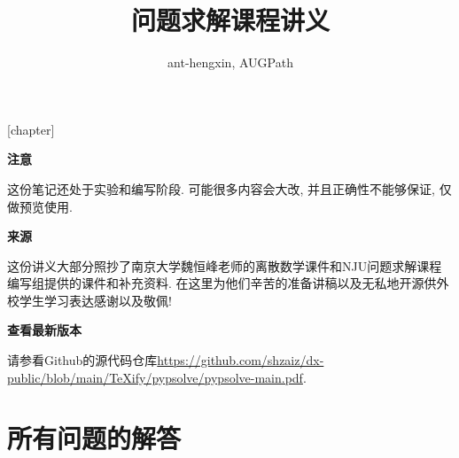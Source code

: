 \usepackage[lastexercise,answerdelayed]{exercise}
[chapter]
\newcommand{\QuestionNB}{\bfseries\arabic{Question}.\ }
\renewcommand{\ExerciseName}{练习题}
\renewcommand{\ExerciseHeader}{\noindent\def\stackalignment{l}%
    \stackunder[0pt]{\colorbox{cyan}{\textcolor{white}{\textbf{\large\ExerciseName\;\LARGE\ExerciseHeaderNB}}}}{\textcolor{lightcyan}{\rule{\linewidth}{2pt}}}\medskip}
\renewcommand{\AnswerName}{Exercises}
\renewcommand{\AnswerHeader}{\ifthenelse{\boolean{firstanswerofthechapter}}%
    {\bigskip\noindent\textcolor{cyan}{\textbf{CHAPTER \thechapter}}\newline\newline%
        \noindent\bfseries\emph{\textcolor{cyan}{\AnswerName\ \ExerciseHeaderNB, page %
                \pageref{\AnswerRef}}}\smallskip}
    {\noindent\bfseries\emph{\textcolor{cyan}{\AnswerName\ \ExerciseHeaderNB, page \pageref{\AnswerRef}}}\smallskip}}
\setlength{\QuestionIndent}{16pt}




\title{问题求解课程讲义}
\author{ant-hengxin, AUGPath}
\maketitle
\begin{center}
{\bf \large 注意}
\end{center}
这份笔记还处于实验和编写阶段. 可能很多内容会大改, 并且正确性不能够保证, 仅做预览使用. 


\begin{center}
{\bf \large 来源}
\end{center}

这份讲义大部分照抄了南京大学魏恒峰老师的离散数学课件和NJU问题求解课程编写组提供的课件和补充资料. 在这里为他们辛苦的准备讲稿以及无私地开源供外校学生学习表达感谢以及敬佩!

\begin{center}
{\bf \large 查看最新版本}
\end{center}  

请参看Github的源代码仓库\url{https://github.com/shzaiz/dx-public/blob/main/TeXify/pypsolve/pypsolve-main.pdf}. 
\tableofcontents

%
%

%


\chapter*{所有问题的解答}
    
    \begin{multicols}{2}\raggedcolumns
        \shipoutAnswer
    \end{multicols}





